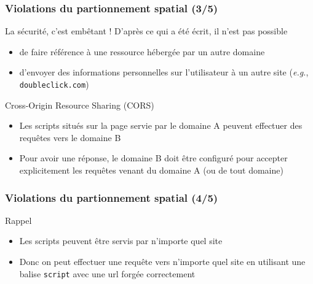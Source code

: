 \begin{reveals}
\begin{frame}
\end{frame}


\begin{frame}
  \frametitle{Violations du partionnement spatial (3/5)}
  
  \begin{block}{La s{\'e}curit{\'e}, c'est emb{\^e}tant !}
    D'apr{\`e}s ce qui a {\'e}t{\'e} {\'e}crit, il n'est pas possible
    \begin{itemize}
    \item de faire r{\'e}f{\'e}rence {\`a} une ressource h{\'e}berg{\'e}e par
      un autre domaine
    \item d'envoyer des informations personnelles sur l'utilisateur {\`a}
      un autre site (\textit{e.g.}, \texttt{doubleclick.com})
    \end{itemize}
  \end{block}

  \pause
  \begin{block}{Cross-Origin Resource Sharing (CORS)}
    \begin{itemize}
    \item Les scripts situ{\'e}s sur la page servie par le domaine A
      peuvent effectuer des requ{\^e}tes vers le domaine B
    \item Pour avoir une r{\'e}ponse, le domaine B doit \^etre
      configur{\'e} pour accepter explicitement les requ{\^e}tes venant du
      domaine A (ou de tout domaine)
    \end{itemize}
  \end{block}
  \pause


\end{frame}


\begin{frame}
  \frametitle{Violations du partionnement spatial (4/5)}

  \begin{block}{Rappel}
    \begin{itemize}
    \item Les scripts peuvent {\^e}tre servis par n'importe quel site
    \item Donc on peut effectuer une requ{\^e}te vers n'importe quel site
      en utilisant une balise \texttt{script} avec une url forg{\'e}e correctement
    \end{itemize}
  \end{block}



\end{frame}
\end{reveals}
